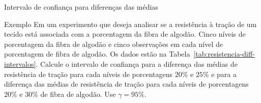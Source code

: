 \documentclass[8pt]{beamer}
\begin{document}
\begin{frame}{Intervalo de confiança para diferenças das médias}

\begin{block}{Exemplo}
	Em um experimento que deseja analisar se a resistência à tração de um tecido está associada com a porcentagem da fibra de algodão. Cinco níveis de porcentagem da fibra de algodão e cinco observações em cada nível de porcentagem de fibra de algodão. Os dados estão na Tabela~\ref{tab:resistencia-diff-intervalos}. Calcule o intervalo de confiança para a diferença das médias de resistência de tração para cada níveis de porcentagens $20\%$ e $25\%$ e para a diferença das médias de resistência de tração para cada níveis de porcentagens $20\%$ e $30\%$ de fibra de algodão. Use $\gamma = 95\%$. 
	\begin{table}[ht]
		\centering
		\caption{Resistência à tração} 
		\label{tab:resistencia-diff-intervalos}
	\end{table}
\end{block}

\end{frame}
\end{document}
